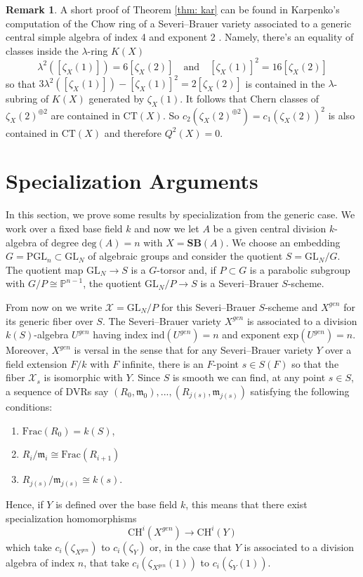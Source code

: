 \documentclass[12pt]{amsart}
\theoremstyle{definition}
\newtheorem{rmk}[thm]{Remark}
\newcounter{item}
\newcommand{\CH}{\mathrm{CH}}
\newcommand{\CT}{\mathrm{CT}}
\newcommand{\SB}{\mathbf{SB}}
\begin{document}
\begin{rmk}\label{rmk: simple}
A short proof of Theorem \ref{thm: kar} can be found in Karpenko's computation of the Chow ring of a Severi--Brauer variety associated to a generic central simple algebra of index 4 and exponent 2 \cite{MR3581317}. Namely, there's an equality of classes inside the $\lambda$-ring $K(X)$ \[\lambda^2([\zeta_X(1)])=6[\zeta_X(2)]\quad \mbox{and} \quad  [\zeta_X(1)]^2=16[\zeta_X(2)]\] so that $3\lambda^2([\zeta_X(1)])-[\zeta_X(1)]^2=2[\zeta_X(2)]$ is contained in the $\lambda$-subring of $K(X)$ generated by $\zeta_X(1)$. It follows that Chern classes of $\zeta_X(2)^{\oplus 2}$ are contained in $\CT(X)$. So $c_2(\zeta_X(2)^{\oplus 2})=c_1(\zeta_X(2))^2$ is also contained in $\CT(X)$ and therefore $Q^2(X)=0$.
\end{rmk}

\section{Specialization Arguments}\label{sec: spec}
In this section, we prove some results by specialization from the generic case. We work over a fixed base field $k$ and now we let $A$ be a given central division $k$-algebra of degree $\mathrm{deg}(A)=n$ with $X=\SB(A)$. We choose an embedding $G=\mathrm{PGL}_n\subset \mathrm{GL}_N$ of algebraic groups and consider the quotient $S=\mathrm{GL}_N/G$. The quotient map $\mathrm{GL}_N\rightarrow S$ is a $G$-torsor and, if $P\subset G$ is a parabolic subgroup with $G/P\cong \mathbb{P}^{n-1}$, the quotient $\mathrm{GL}_N/P\rightarrow S$ is a Severi--Brauer $S$-scheme. 

From now on we write $\mathcal{X}=\mathrm{GL}_N/P$ for this Severi--Brauer $S$-scheme and $X^{gen}$ for its generic fiber over $S$. The Severi--Brauer variety $X^{gen}$ is associated to a division $k(S)$-algebra $U^{gen}$ having index $\mathrm{ind}(U^{gen})=n$ and exponent $\mathrm{exp}(U^{gen})=n$. Moreover, $X^{gen}$ is versal in the sense that for any Severi--Brauer variety $Y$ over a field extension $F/k$ with $F$ infinite, there is an $F$-point $s\in S(F)$ so that the fiber $\mathcal{X}_s$ is isomorphic with $Y$. Since $S$ is smooth we can find, at any point $s\in S$, a sequence of DVRs say $(R_0,\mathfrak{m}_0),...,(R_{j(s)},\mathfrak{m}_{j(s)})$ satisfying the following conditions:
\begin{enumerate}
	\item $\mathrm{Frac}(R_0)=k(S)$,  
	\item $R_i/\mathfrak{m}_i\cong \mathrm{Frac}(R_{i+1})$
	\item $R_{j(s)}/\mathfrak{m}_{j(s)}\cong k(s)$.
\end{enumerate}
Hence, if $Y$ is defined over the base field $k$, this means that there exist specialization homomorphisms \cite[\S20.3]{MR1644323} \[\CH^i(X^{gen})\rightarrow \CH^i(Y)\] which take $c_i(\zeta_{X^{gen}})$ to $c_i(\zeta_{Y})$ or, in the case that $Y$ is associated to a division algebra of index $n$, that take $c_i(\zeta_{X^{gen}}(1))$ to $c_i(\zeta_Y(1))$.
\end{document}
